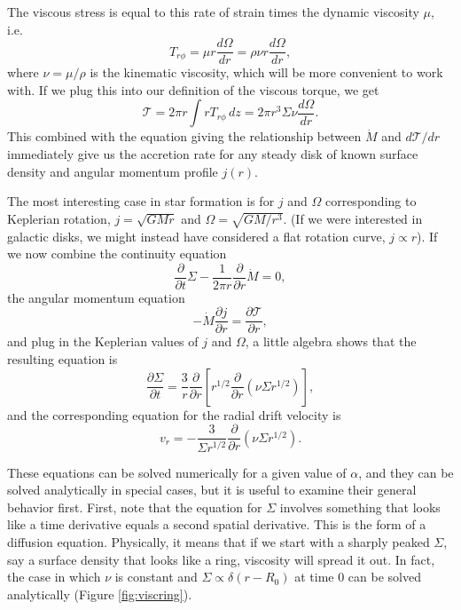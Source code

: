 The viscous stress is equal to this rate of strain times the dynamic viscosity $\mu$, i.e.
\begin{equation}
T_{r\phi} = \mu r \frac{d\Omega}{dr} = \rho \nu r \frac{d\Omega}{dr},
\end{equation}
where $\nu=\mu/\rho$ is the kinematic viscosity, which will be more convenient to work with. If we plug this into our definition of the viscous torque, we get
\begin{equation}
\mathcal{T} = 2\pi r \int r T_{r\phi}\, dz = 2\pi r^3 \Sigma \nu \frac{d\Omega}{dr}.
\end{equation}
This combined with the equation giving the relationship between $\dot{M}$ and $d\mathcal{T}/dr$ immediately give us the accretion rate for any steady disk of known surface density and angular momentum profile $j(r)$.

The most interesting case in star formation is for $j$ and $\Omega$ corresponding to Keplerian rotation, $j=\sqrt{GMr}$ and $\Omega=\sqrt{GM/r^3}$. (If we were interested in galactic disks, we might instead have considered a flat rotation curve, $j\propto r$). If we now combine the continuity equation
\begin{equation}
\frac{\partial}{\partial t}\Sigma - \frac{1}{2\pi r} \frac{\partial}{\partial r}\dot{M} = 0,
\end{equation}
the angular momentum equation
\begin{equation}
-\dot{M} \frac{\partial j}{\partial r} = \frac{\partial \mathcal{T}}{\partial r},
\end{equation}
and plug in the Keplerian values of $j$ and $\Omega$, a little algebra shows that the resulting equation is
\begin{equation}
\frac{\partial \Sigma}{\partial t} = \frac{3}{r} \frac{\partial}{\partial r} \left[r^{1/2} \frac{\partial}{\partial r}\left(\nu \Sigma r^{1/2}\right)\right],
\end{equation}
and the corresponding equation for the radial drift velocity is
\begin{equation}
v_r = -\frac{3}{\Sigma r^{1/2}} \frac{\partial}{\partial r}(\nu \Sigma r^{1/2}).
\end{equation}

These equations can be solved numerically for a given value of $\alpha$, and they can be solved analytically in special cases, but it is useful to examine their general behavior first. First, note that the equation for $\Sigma$ involves something that looks like a time derivative equals a second spatial derivative. This is the form of a diffusion equation. Physically, it means that if we start with a sharply peaked $\Sigma$, say a surface density that looks like a ring, viscosity will spread it out. In fact, the case in which $\nu$ is constant and $\Sigma\propto \delta(r-R_0)$ at time 0 can be solved analytically (Figure \ref{fig:viscring}).

